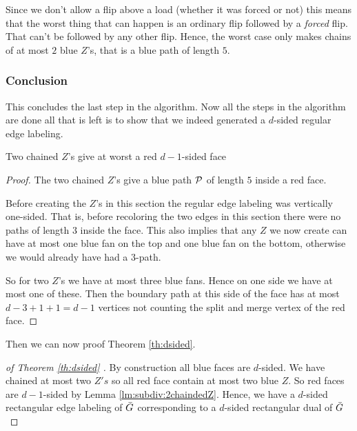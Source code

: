   Since we don't allow a flip above a load (whether it was forced or not) this means that the worst thing that can happen is an ordinary flip followed by a \emph{forced} flip. That can't be followed by any other flip. Hence, the worst case only makes chains of at most $2$ blue $Z$'s, that is a blue path of length $5$.


\subsubsection{Conclusion}
  This concludes the last step in the algorithm.
  Now all the steps in the algorithm are done all that is left is to show that we indeed generated a $d$-sided regular edge labeling.
  \begin{lemma}
    \label{lm:subdiv:2chaindedZ}
    Two chained $Z$'s give at worst a red $d-1$-sided face
  \end{lemma}
  \begin{proof}
    The two chained $Z$'s give a blue path $\P$ of length $5$ inside a red face.

    Before creating the $Z$'s in this section the regular edge labeling was vertically one-sided. That is, before recoloring the two edges in this section there were no paths of length $3$ inside the face. This also implies that any $Z$ we now create can have at most one blue fan on the top and one blue fan on the bottom, otherwise we would already have had a $3$-path.

    So for two $Z$'s we have at most three blue fans. Hence on one side we have at most one of these. Then the boundary path at this side of the face has at most $d-3 + 1 +1 =d-1$ vertices not counting the split and merge vertex of the red face.
  \end{proof}

    Then we can now proof Theorem \ref{th:dsided}.

  \begin{proof}[of Theorem \ref{th:dsided} ]
    By construction all blue faces are $d$-sided. We have chained at most two $Z's$ so all red face contain at most two blue $Z$. So red faces are $d-1$-sided by Lemma \ref{lm:subdiv:2chaindedZ}. Hence, we have a $d$-sided rectangular edge labeling of $\ext G$ corresponding to a $d$-sided rectangular dual of $\ext G$
  \end{proof}
